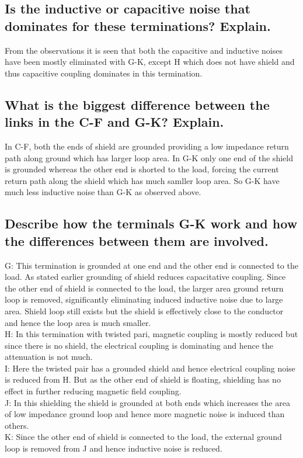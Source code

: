 \documentclass[12pt,a4paper,UKenglish]{article}
\begin{document}
\subsection{Is the inductive or capacitive noise that dominates for these terminations? Explain.}
From the observations it is seen that both the capacitive and inductive noises have been mostly eliminated with G-K,  except H which does not have shield and thus capacitive coupling dominates in this termination.  

\subsection{What is the biggest difference between the links in the C-F and G-K? Explain.}
In C-F, both the ends of shield are grounded providing a low impedance return path along ground which has larger loop area. In G-K only one end of the shield is grounded whereas the other end is shorted to the load, forcing the current return path along the shield which has much samller loop area. So G-K have much less inductive noise than G-K as observed above.

\subsection{Describe how the terminals G-K work and how the differences between them are involved.}
G: This termination is grounded at one end and the other end is connected to the load. As stated earlier grounding of shield reduces capacitative coupling. Since the other end of shield is connected to the load, the larger area ground return loop is removed, significantly eliminating induced inductive noise due to large area. Shield loop still exists but the shield is effectively close to the conductor and hence the loop area is much smaller. \\
H: In this termination with twisted pari, magnetic coupling is mostly reduced but since there is no shield, the electrical coupling is dominating and hence the attenuation is not much. \\
I: Here the twisted pair has a grounded shield and hence electrical coupling noise is reduced from H. But as the other end of shield is floating, shielding has no effect in further reducing magnetic field coupling. \\
J: In this shielding the shield is grounded at both ends which increases the area of low impedance ground loop and hence more magnetic noise is induced than others. \\
K: Since the other end of shield is connected to the load, the external ground loop is removed from J and hence inductive noise is reduced. \\
\end{document}
